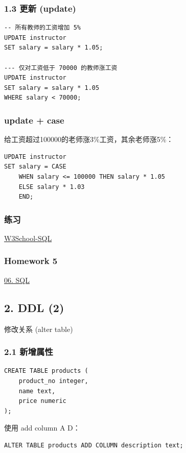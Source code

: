 \documentclass[aspectratio=169, 14pt]{beamer}
\begin{document}
\begin{frame}[fragile]
    \frametitle{1.3 更新 (update)}

    \begin{verbatim}
-- 所有教师的工资增加 5%
UPDATE instructor
SET salary = salary * 1.05;

--- 仅对工资低于 70000 的教师涨工资
UPDATE instructor
SET salary = salary * 1.05
WHERE salary < 70000;
    \end{verbatim}

\end{frame}
\begin{frame}[fragile]
    \frametitle{update + case}

给工资超过100000的老师涨3\%工资，其余老师涨5\%：

\begin{verbatim}
UPDATE instructor
SET salary = CASE
    WHEN salary <= 100000 THEN salary * 1.05
    ELSE salary * 1.03
    END;
\end{verbatim}


\end{frame}

\begin{frame}
    \frametitle{练习}
\href{https://www.w3school.com.cn/quiz/quiz.asp?quiz=sql}{W3School-SQL}
\end{frame}

\begin{frame}
    \frametitle{Homework 5}

\href{https://github.com/ChenZhongPu/db-swufe/tree/master/06_sql}{06. SQL}
    
\end{frame}

\begin{frame}
    \section{\textcolor{darkmidnightblue}{2. DDL (2)}}
修改关系 (\alert{alter table})
\end{frame}

\begin{frame}[fragile]
    \frametitle{2.1 新增属性}

    \begin{verbatim}
CREATE TABLE products (
    product_no integer,
    name text,
    price numeric
);
    \end{verbatim}

使用 \alert{add column A D}：

\begin{verbatim}
ALTER TABLE products ADD COLUMN description text;    
\end{verbatim}

\end{frame}
\end{document}
